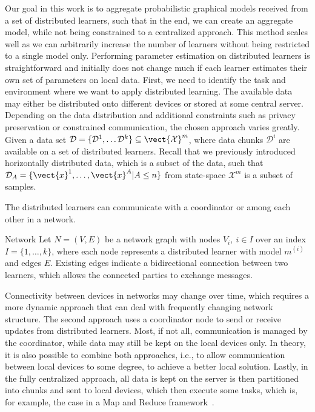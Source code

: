Our goal in this work is to aggregate probabilistic graphical models received from a set of distributed learners, such that in the end, we can create an aggregate model, while not being constrained to a centralized approach.
This method scales well as we can arbitrarily increase the number of learners without being restricted to a single model only.
Performing parameter estimation on distributed learners is straightforward and initially does not change much if each learner estimates their own set of parameters on local data.
First, we need to identify the task and environment where we want to apply distributed learning.
The available data may either be distributed onto different devices or stored at some central server.
Depending on the data distribution and additional constraints such as privacy preservation or constrained communication, the chosen approach varies greatly.
Given a data set $\mathcal{D} = \{\mathcal{D}^1, \ldots \mathcal{D}^k\} \subseteq \vect{\mathcal{X}}^m$,
where data chunks $\mathcal{D}^i$ are available on a set of distributed learners.
Recall that we previously introduced horizontally distributed data, which is a subset of the data, such that $\mathcal{D}_{A} = \{\vect{x}^1, \ldots, \vect{x}^A \lvert A \leq n\}$ from state-space $\mathcal{X}^m$ is a subset of samples.

The distributed learners can communicate with a coordinator or among each other in a network.

\begin{definition}{Network}
    Let $N = (V, E)$ be a network graph with nodes $V_i, \: i \in I$ over an index $I=\{1,\ldots,k\}$, where each node represents a distributed learner with model $m^{(i)}$ and edges $E$. 
    Existing edges indicate a bidirectional connection between two learners, which allows the connected parties to exchange messages.
\end{definition}

Connectivity between devices in networks may change over time, which requires a more dynamic approach that can deal with frequently changing network structure.
The second approach uses a coordinator node to send or receive updates from distributed learners. 
Most, if not all, communication is managed by the coordinator, while data may still be kept on the local devices only.
In theory, it is also possible to combine both approaches, i.e., to allow communication between local devices to some degree, to achieve a better local solution.
Lastly, in the fully centralized approach, all data is kept on the server is then partitioned into chunks and sent to local devices, which then execute some tasks, which is, for example, the case in a Map and Reduce framework~\cite{dean2010mapreduce}.


